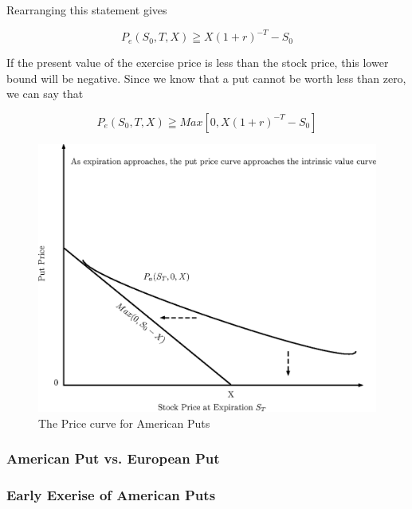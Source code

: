 \documentclass{book}
\theoremstyle{definition}
\theoremstyle{remark}
\begin{document}
            Rearranging this statement gives
            
                \begin{equation}
                    P_e(S_0,T,X) \geqq X(1 + r)^{-T} - S_0
                \end{equation}
                
            If the present value of the exercise price is less than the stock price, this lower bound will be negative. Since we know that a put cannot be worth less than  zero, we can say that
            
                \begin{equation}
                    P_e(S_0,T,X) \geqq Max \left[ 0, X(1+r)^{-T} - S_0 \right]
                \end{equation}

                \begin{figure}[h]
                    \centering
                        \includegraphics[scale=0.45]{images/fig:APutExp.eps}
                    \caption{The Price curve for American Puts}
                    \label{fig:APutExp}                
                \end{figure}
                
            
        \subsubsection{American Put vs. European Put}
        \subsubsection{Early Exerise of American Puts}
\end{document}
